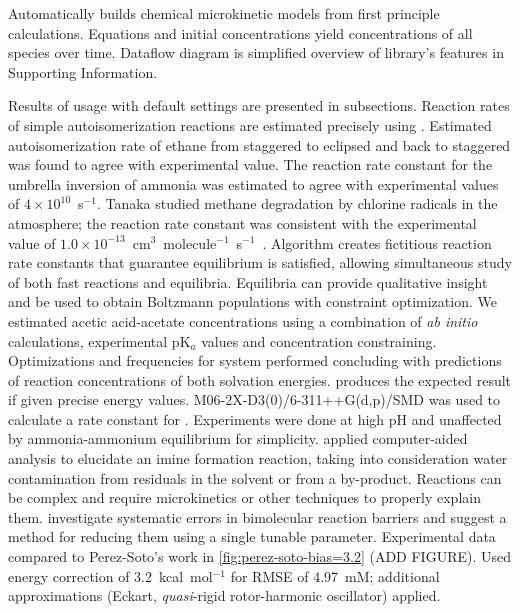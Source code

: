 Automatically builds chemical microkinetic models from first principle calculations.
Equations and initial concentrations yield concentrations of all species over time.
Dataflow diagram is simplified overview of library's features in Supporting Information.

Results of \overreact usage with default settings are presented in subsections.
Reaction rates of simple autoisomerization reactions are estimated precisely using \overreact.
Estimated autoisomerization rate of ethane from staggered to eclipsed and back to staggered was found to agree with experimental value.
The reaction rate constant for the umbrella inversion of ammonia was estimated to agree with experimental values of $4 \times 10^{10}$~s$^{-1}$.
Tanaka \cite{Tanaka_1996} studied methane degradation by chlorine radicals in the atmosphere; the reaction rate constant was consistent with the experimental value of $1.0 \times 10^{-13}$~cm$^3$~molecule$^{-1}$~s$^{-1}$~\cite{Burkholder_2020}.
Algorithm creates fictitious reaction rate constants that guarantee equilibrium is satisfied, allowing simultaneous study of both fast reactions and equilibria.
Equilibria can provide qualitative insight and be used to obtain Boltzmann populations with constraint optimization.
We estimated acetic acid-acetate concentrations using a combination of \emph{ab initio} calculations, experimental pK$_a$ values and  concentration constraining.
Optimizations and frequencies for  system performed concluding with predictions of reaction concentrations of both solvation energies.
\overreact produces the expected result if given precise energy values.
M06-2X-D3(0)/6-311++G(d,p)/SMD was used to calculate a rate constant for .
Experiments were done at high pH and unaffected by ammonia-ammonium equilibrium for simplicity.
\citeauthor{P_rez_Soto_2020} applied computer-aided analysis to elucidate an imine formation reaction, taking into consideration water contamination from residuals in the solvent or from a by-product.
Reactions can be complex and require microkinetics or other techniques to properly explain them.
\citeauthor{P_rez_Soto_2020} investigate systematic errors in bimolecular reaction barriers and suggest a method for reducing them using a single tunable parameter.
Experimental data compared to Perez-Soto's work in \cref{fig:perez-soto-bias=3.2} (ADD FIGURE).
Used energy correction of 3.2~kcal~mol$^{-1}$ for RMSE of 4.97~mM; additional approximations (Eckart, \emph{quasi}-rigid rotor-harmonic oscillator) applied.
